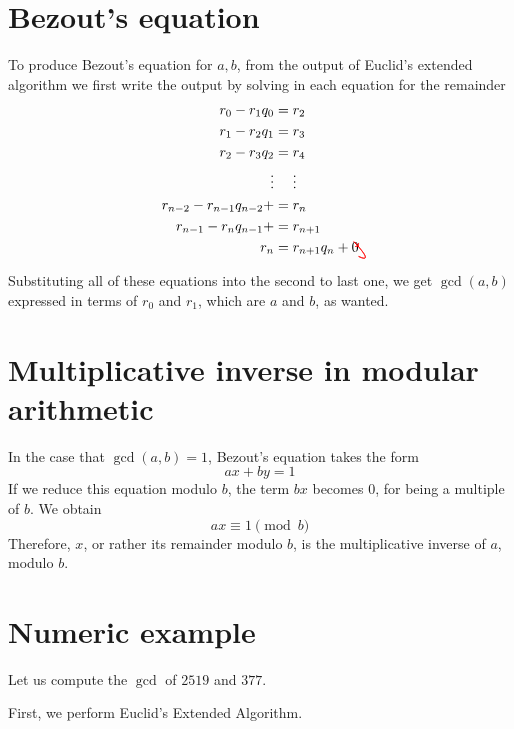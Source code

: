 \documentclass{amsart}
\newcommand{\tikzmark}[1]{\tikz[overlay,remember picture] \node (#1) {};}
\begin{document}
\section*{Bezout's equation}

To produce Bezout's equation for $a,b$, from the output of Euclid's extended algorithm we first write the output by solving in each equation for the remainder 
\begin{align*}
r_{0}-r_1q_0&=\tikzmark{a}r_2\\
r_1-\tikzmark{b}r_2q_1&=\tikzmark{c}r_3\\
r_2-\tikzmark{d}r_3q_2&=r_4\\
\vdots&\phantom{{}={}}\vdots\\
r_{n-2}-r_{n-1}q_{n-2}+&=\tikzmark{e}r_{n}\\
r_{n-1}-\tikzmark{f}r_{n}q_{n-1}+&=r_{n+1}\\
r_{n}&=r_{n+1}q_{n} + 0
\begin{tikzpicture}[overlay,remember picture,out=225,out=335,distance=0.6cm]
    \draw[->,red] (a.south) to (b.north);
		\draw[->,red] (c.south) to (d.north);
		\draw[->,red] (e.south) to (f.north);
  \end{tikzpicture}
\end{align*}

Substituting all of these equations into the second to last one, we get $\gcd(a,b)$ expressed in terms of $r_0$ and $r_1$, which are $a$ and $b$, as wanted.

\section*{Multiplicative inverse in modular arithmetic}
In the case that $\gcd(a,b)=1$, Bezout's equation takes the form $$ax+by=1$$
If we reduce this equation modulo $b$, the term $bx$ becomes $0$, for being a multiple of $b$. We obtain $$ax\equiv 1\pmod{b}$$
Therefore, $x$, or rather its remainder modulo $b$, is the multiplicative inverse of $a$, modulo $b$.

\section*{Numeric example} Let us compute the $\gcd$ of $2519$ and $377$.

First, we perform Euclid's Extended Algorithm.
\end{document}
